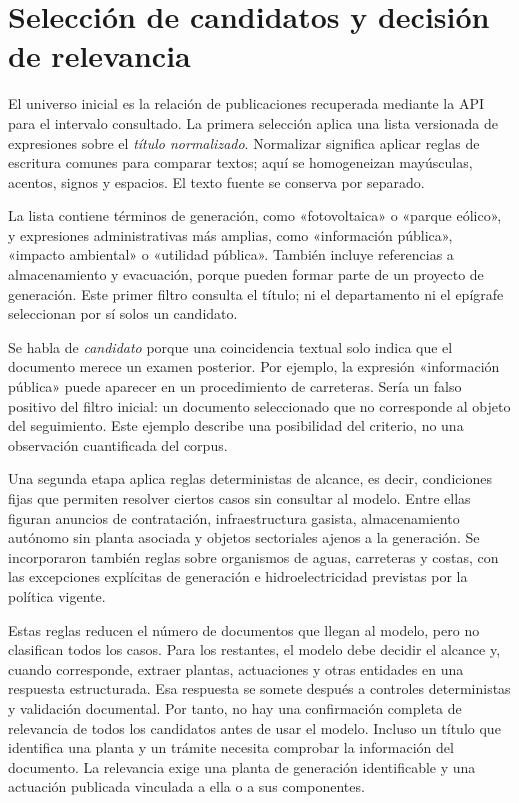 \section{Selección de candidatos y decisión de relevancia}
\label{sec:candidatos}
El universo inicial es la relación de publicaciones recuperada mediante la
API para el intervalo consultado. La primera selección aplica una lista versionada de
expresiones sobre el \emph{título normalizado}. Normalizar significa aplicar
reglas de escritura comunes para comparar textos; aquí se homogeneizan
mayúsculas, acentos, signos y espacios. El texto fuente se conserva por separado.

La lista contiene términos de generación, como «fotovoltaica» o «parque
eólico», y expresiones administrativas más amplias, como «información
pública», «impacto ambiental» o «utilidad pública». También incluye referencias
a almacenamiento y evacuación, porque pueden formar parte de un proyecto
de generación. Este primer filtro consulta el título; ni el departamento
ni el epígrafe seleccionan por sí solos un candidato.

Se habla de \emph{candidato} porque una coincidencia textual solo indica que
el documento merece un examen posterior. Por ejemplo, la expresión
«información pública» puede aparecer en un procedimiento de carreteras.
Sería un falso positivo del filtro inicial: un documento seleccionado que no
corresponde al objeto del seguimiento. Este ejemplo describe una posibilidad
del criterio, no una observación cuantificada del corpus.

Una segunda etapa aplica reglas deterministas de alcance, es decir,
condiciones fijas que permiten resolver ciertos casos sin consultar al modelo.
Entre ellas figuran anuncios de contratación, infraestructura gasista,
almacenamiento autónomo sin planta asociada y objetos sectoriales ajenos a
la generación. Se incorporaron también reglas sobre organismos de aguas,
carreteras y costas, con las excepciones explícitas de generación e
hidroelectricidad previstas por la política vigente.

Estas reglas reducen el número de documentos que llegan al modelo, pero no
clasifican todos los casos. Para los restantes, el modelo debe decidir el
alcance y, cuando corresponde, extraer plantas, actuaciones y otras entidades
en una respuesta estructurada. Esa respuesta se somete después a controles
deterministas y validación documental. Por tanto, no hay una confirmación
completa de relevancia de todos los candidatos antes de usar el modelo. Incluso
un título que identifica una planta y un trámite necesita comprobar la
información del documento. La relevancia exige una planta de generación
identificable y una actuación publicada vinculada a ella o a sus componentes.

